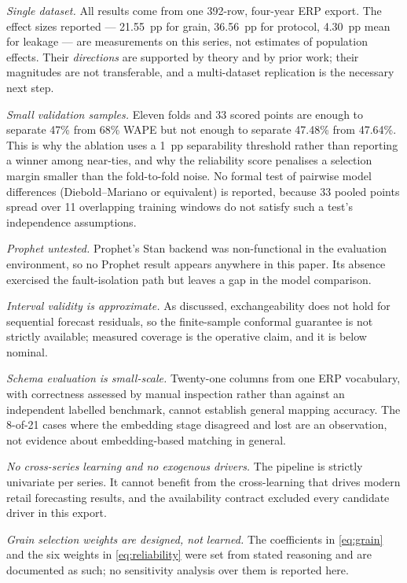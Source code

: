 \documentclass[conference]{IEEEtran}
\begin{document}
\emph{Single dataset.} All results come from one 392-row, four-year ERP
export. The effect sizes reported --- 21.55~pp for grain, 36.56~pp for
protocol, 4.30~pp mean for leakage --- are measurements on this series, not
estimates of population effects. Their \emph{directions} are supported by
theory and by prior work; their magnitudes are not transferable, and a
multi-dataset replication is the necessary next step.

\emph{Small validation samples.} Eleven folds and 33 scored points are enough
to separate 47\% from 68\% WAPE but not enough to separate 47.48\% from
47.64\%. This is why the ablation uses a 1~pp separability threshold rather
than reporting a winner among near-ties, and why the reliability score
penalises a selection margin smaller than the fold-to-fold noise. No formal
test of pairwise model differences (Diebold--Mariano or equivalent) is
reported, because 33 pooled points spread over 11 overlapping training windows
do not satisfy such a test's independence assumptions.

\emph{Prophet untested.} Prophet's Stan backend was non-functional in the
evaluation environment, so no Prophet result appears anywhere in this paper.
Its absence exercised the fault-isolation path but leaves a gap in the model
comparison.

\emph{Interval validity is approximate.} As discussed, exchangeability does not
hold for sequential forecast residuals, so the finite-sample conformal
guarantee is not strictly available; measured coverage is the operative claim,
and it is below nominal.

\emph{Schema evaluation is small-scale.} Twenty-one columns from one ERP
vocabulary, with correctness assessed by manual inspection rather than against
an independent labelled benchmark, cannot establish general mapping accuracy.
The 8-of-21 cases where the embedding stage disagreed and lost are an
observation, not evidence about embedding-based matching in general.

\emph{No cross-series learning and no exogenous drivers.} The pipeline is
strictly univariate per series. It cannot benefit from the cross-learning that
drives modern retail forecasting results, and the availability contract
excluded every candidate driver in this export.

\emph{Grain selection weights are designed, not learned.} The coefficients in
\eqref{eq:grain} and the six weights in \eqref{eq:reliability} were set from
stated reasoning and are documented as such; no sensitivity analysis over them
is reported here.
\end{document}
